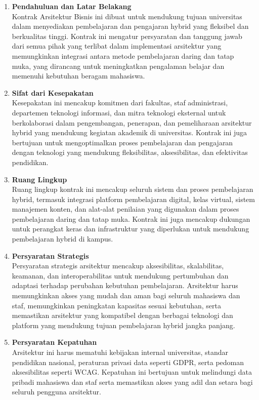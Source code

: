 \begin{enumerate}
	\item \textbf{Pendahuluan dan Latar Belakang} \\
	Kontrak Arsitektur Bisnis ini dibuat untuk mendukung tujuan universitas dalam menyediakan pembelajaran dan pengajaran hybrid yang fleksibel dan berkualitas tinggi. Kontrak ini mengatur persyaratan dan tanggung jawab dari semua pihak yang terlibat dalam implementasi arsitektur yang memungkinkan integrasi antara metode pembelajaran daring dan tatap muka, yang dirancang untuk meningkatkan pengalaman belajar dan memenuhi kebutuhan beragam mahasiswa.
	
	\item \textbf{Sifat dari Kesepakatan} \\
	Kesepakatan ini mencakup komitmen dari fakultas, staf administrasi, departemen teknologi informasi, dan mitra teknologi eksternal untuk berkolaborasi dalam pengembangan, penerapan, dan pemeliharaan arsitektur hybrid yang mendukung kegiatan akademik di universitas. Kontrak ini juga bertujuan untuk mengoptimalkan proses pembelajaran dan pengajaran dengan teknologi yang mendukung fleksibilitas, aksesibilitas, dan efektivitas pendidikan.
	
	\item \textbf{Ruang Lingkup} \\
	Ruang lingkup kontrak ini mencakup seluruh sistem dan proses pembelajaran hybrid, termasuk integrasi platform pembelajaran digital, kelas virtual, sistem manajemen konten, dan alat-alat penilaian yang digunakan dalam proses pembelajaran daring dan tatap muka. Kontrak ini juga mencakup dukungan untuk perangkat keras dan infrastruktur yang diperlukan untuk mendukung pembelajaran hybrid di kampus.
	
	\item \textbf{Persyaratan Strategis} \\
	Persyaratan strategis arsitektur mencakup aksesibilitas, skalabilitas, keamanan, dan interoperabilitas untuk mendukung pertumbuhan dan adaptasi terhadap perubahan kebutuhan pembelajaran. Arsitektur harus memungkinkan akses yang mudah dan aman bagi seluruh mahasiswa dan staf, memungkinkan peningkatan kapasitas sesuai kebutuhan, serta memastikan arsitektur yang kompatibel dengan berbagai teknologi dan platform yang mendukung tujuan pembelajaran hybrid jangka panjang.
	
	\item \textbf{Persyaratan Kepatuhan} \\
	Arsitektur ini harus mematuhi kebijakan internal universitas, standar pendidikan nasional, peraturan privasi data seperti GDPR, serta pedoman aksesibilitas seperti WCAG. Kepatuhan ini bertujuan untuk melindungi data pribadi mahasiswa dan staf serta memastikan akses yang adil dan setara bagi seluruh pengguna arsitektur.
	

\end{enumerate}
